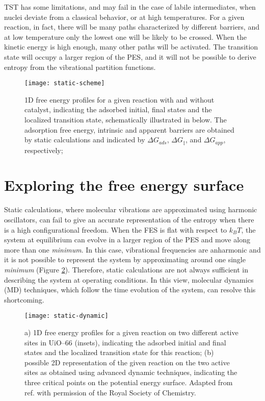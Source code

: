 \npar
TST has some limitations, and may fail in the case of labile intermediates, when nuclei deviate from a classical behavior, or at high temperatures. For a given reaction, in fact, there will be many paths characterized by different barriers, and at low temperature only the lowest one will be likely to be crossed. When the kinetic energy is high enough, many other paths will be activated. The transition state will occupy a larger region of the PES, and it will not be possible to derive entropy from the vibrational partition functions.
\begin{figure}[!htbp]
	\centering
 	\texttt{[image: static-scheme]}
	\caption{1D free energy profiles for a given reaction with and without catalyst, indicating the adsorbed initial, final states and the localized transition state, schematically illustrated in below. The adsorption free energy, intrinsic and apparent barriers are obtained by static calculations and indicated by $\Delta G_{ads}$, $\Delta G_{\ddagger}$, and $\Delta G_{app}$, respectively;}
	\label{fig:static-scheme}
\end{figure}


\section{Exploring the free energy surface}
Static calculations, where molecular vibrations are approximated using harmonic oscillators, can fail to give an accurate representation of the entropy when there is a high configurational freedom. When the FES is flat with respect to $k_B T$, the system at equilibrium can evolve in a larger region of the PES and move along more than one \textit{minimum}. In this case, vibrational frequencies are anharmonic and it is not possible to represent the system by approximating around one single \textit{minimum} (Figure \ref{fig:static-dynamic}). Therefore, static calculations are not always sufficient in describing the system at operating conditions. In this view, molecular dynamics (MD) techniques, which follow the time evolution of the system, can resolve this shortcoming.
\begin{figure}[!htbp]
	\centering
 	\texttt{[image: static-dynamic]}
	\caption{a) 1D free energy profiles for a given reaction on two different active sites in UiO--66 (insets), indicating the adsorbed initial and final states and the localized transition state for this reaction; (b) possible 2D representation of the given reaction on the two active sites as obtained using advanced dynamic techniques, indicating the three critical points on the potential energy surface. Adapted from ref. \cite{rogge2017metal} with permission of the Royal Society of Chemistry.}
	\label{fig:static-dynamic}
\end{figure}

